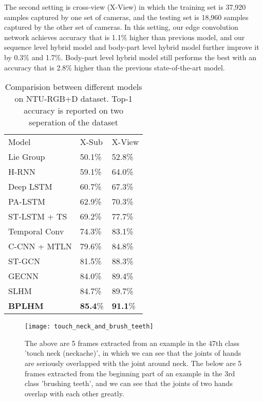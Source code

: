 \documentclass[a4paper,11pt]{article}
\begin{document}
The second setting is cross-view (X-View) in which the training set is 37,920 samples captured by one set of cameras, and the testing set is 18,960 samples captured by the other set of cameras. In this setting, our edge convolution network achieves accuracy that is 1.1\% higher than previous model, and our sequence level hybrid model and body-part level hybrid model further improve it by 0.3\% and 1.7\%. Body-part level hybrid model still performs the best with an accuracy that is 2.8\% higher than the previous state-of-the-art model.
\begin{table}
\begin{center}
\caption{Comparision between different models on NTU-RGB+D dataset. Top-1 accuracy is reported on two seperation of the dataset}
\label{ntu}
\begin{tabular}{lll}
\hline\noalign{\smallskip}
Model & X-Sub & X-View\\
\noalign{\smallskip}
\hline
\noalign{\smallskip}
Lie Group \cite{vemulapalli2014human} & 50.1\% & 52.8\% \\
H-RNN \cite{du2015hierarchical} & 59.1\% & 64.0\% \\
Deep LSTM \cite{shahroudy2016ntu} & 60.7\% & 67.3\%\\
PA-LSTM \cite{shahroudy2016ntu} & 62.9\% & 70.3\%\\
ST-LSTM + TS \cite{liu2016spatio} & 69.2\% & 77.7\%\\
Temporal Conv \cite{soo2017interpretable} & 74.3\% & 83.1\%\\
C-CNN + MTLN \cite{ke2017new} \quad \quad \quad \quad & 79.6\% & 84.8\%\\
ST-GCN \cite{yan2018spatial} & 81.5\% & 88.3\%
\\
\hline{GECNN} & 84.0\% & 89.4\% \\
{SLHM} & {84.7}\% &{89.7}\% \\
{\bf BPLHM} & {\bf 85.4}\% &{\bf 91.1}\% \\   %
\hline
\end{tabular}
\end{center}
\end{table}


\begin{figure}[h]
\centering
\texttt{[image: touch\_neck\_and\_brush\_teeth]}
\caption{The above are 5 frames extracted from an example in the 47th class 'touch neck (neckache)', in which we can see that the joints of hands are seriously overlapped with the joint around neck. The below are 5 frames extracted from the beginning part of an example in the 3rd class 'brushing teeth', and we can see that the joints of two hands overlap with each other greatly.}
\label{fig:example}
\end{figure}
\end{document}
